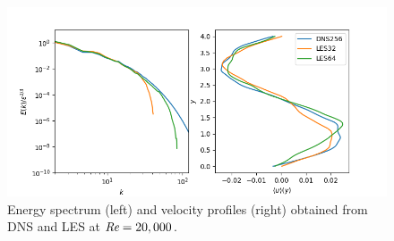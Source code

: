 \documentclass[a4paper, 11pt]{article}
\begin{document}
\begin{figure}
    \includegraphics[width=\textwidth]{dns_les.png}
    \caption{Energy spectrum (left) and velocity profiles (right) obtained from 
    DNS and LES at $\textit{Re} = 20,000$. \label{les_dns}}
\end{figure}

\printbibliography
\end{document}

